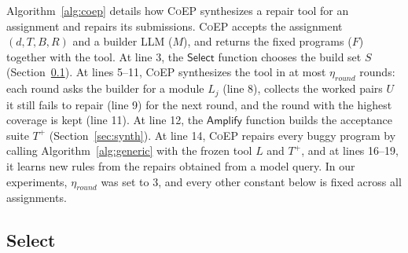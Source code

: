 \documentclass[acmsmall,screen,review,anonymous,nonacm]{acmart}
\newcommand{\tool}{\textsc{CoEP}\xspace}
\newcommand{\aux}[1]{\ensuremath{\mathsf{#1}}}
\newcommand{\V}[1]{\ensuremath{\mathit{#1}}}
\begin{document}
Algorithm~\ref{alg:coep} details how \tool synthesizes a repair tool for an assignment and repairs its submissions. \tool accepts the assignment $(d, T, B, R)$ and a builder LLM ($M$), and returns the fixed programs ($F$) together with the tool. At line 3, the \aux{Select} function chooses the build set $S$ (Section~\ref{sec:select}). At lines 5--11, \tool synthesizes the tool in at most $\eta_{\V{round}}$ rounds: each round asks the builder for a module $L_j$ (line 8), collects the worked pairs $U$ it still fails to repair (line 9) for the next round, and the round with the highest coverage is kept (line 11). At line 12, the \aux{Amplify} function builds the acceptance suite $T^{+}$ (Section~\ref{sec:synth}). At line 14, \tool repairs every buggy program by calling Algorithm~\ref{alg:generic} with the frozen tool $L$ and $T^{+}$, and at lines 16--19, it learns new rules from the repairs obtained from a model query. In our experiments, $\eta_{\V{round}}$ was set to 3, and every other constant below is fixed across all assignments.

\subsection{Select}
\label{sec:select}
\end{document}
